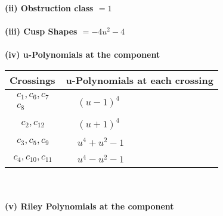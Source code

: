 \documentclass[1p]{elsarticle_modified}
\theoremstyle{definition}
\begin{document}
\flushleft \textbf{(ii) Obstruction class $= 1$}\\~\\
\flushleft \textbf{(iii) Cusp Shapes $= -4 u^2-4$}\\~\\
\newpage\renewcommand{\arraystretch}{1}
\flushleft \textbf{(iv) u-Polynomials at the component}\newline \\
\begin{tabular}{m{50pt}|m{274pt}}
Crossings & \hspace{64pt}u-Polynomials at each crossing \\
\hline $$\begin{aligned}c_{1},c_{6},c_{7}\\c_{8}\end{aligned}$$&$\begin{aligned}
&(u-1)^4
\end{aligned}$\\
\hline $$\begin{aligned}c_{2},c_{12}\end{aligned}$$&$\begin{aligned}
&(u+1)^4
\end{aligned}$\\
\hline $$\begin{aligned}c_{3},c_{5},c_{9}\end{aligned}$$&$\begin{aligned}
&u^4+u^2-1
\end{aligned}$\\
\hline $$\begin{aligned}c_{4},c_{10},c_{11}\end{aligned}$$&$\begin{aligned}
&u^4- u^2-1
\end{aligned}$\\
\hline
\end{tabular}\\~\\
\newpage\renewcommand{\arraystretch}{1}
\flushleft \textbf{(v) Riley Polynomials at the component}\newline \\
\end{document}
